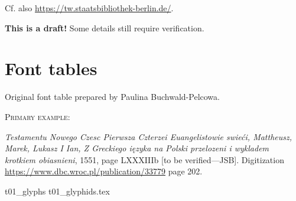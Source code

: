 \documentclass[12pt]{article}
\newcommand{\bg}{\begingl}
\newcommand{\PTglyph}[2]{\texttt{[image: glyphs/\#2]}}
\begin{document}
\noindent
Cf. also \url{https://tw.staatsbibliothek-berlin.de/}.

\bigskip
\textbf{This is a draft!} Some details still require verification.

\newpage
\section{Font tables}
\label{sec:font-tables}


%
  \begin{flushleft}
    \label{fig:t01}

    \medskip
    
      Original font table prepared by Paulina Buchwald-Pelcowa.

      \bigskip

        \textsc{Primary example:}

  \textit{Testamentu Nowego Czesc Pierwsza Czterzei Euangelistowie
    swieći, Mattheusz, Marek, Lukasz I Ian, Z Greckiego ięzyka na
    Polski przelozeni i wykladem krotkiem obiasnieni}, 1551, page
  LXXXIIIb [to be verified---JSB].  Digitization
  \url{https://www.dbc.wroc.pl/publication/33779} page 202.

      
 {t01_glyphs}
  {t01_glyphids.tex}
\endgl \xe

\end{flushleft}

\end{document}

